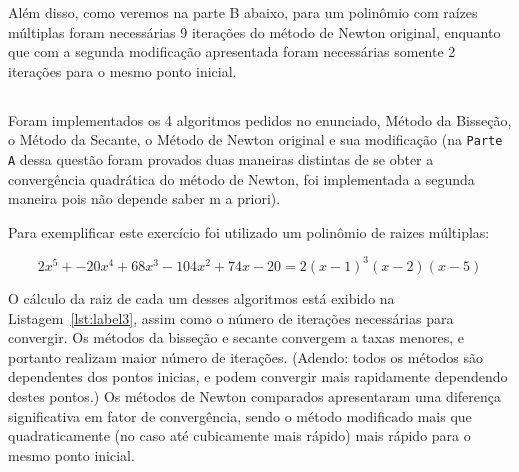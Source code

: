 \documentclass[12pt,a4paper,final]{article}
\begin{document}
Além disso, como veremos na parte B abaixo, para um polinômio com raízes múltiplas
foram necessárias 9 iterações do método de Newton original, enquanto que com a segunda modificação
apresentada foram necessárias somente 2 iterações para o mesmo ponto inicial.


\subsection{}

Foram implementados os 4 algoritmos pedidos no enunciado, Método da Bisseção, o Método da Secante,
o Método de Newton original e sua modificação (na \texttt{Parte A} dessa questão foram provados duas maneiras
distintas de se obter a convergência quadrática do método de Newton, foi implementada a segunda maneira pois não
depende saber m a priori).

Para exemplificar este exercício foi utilizado um polinômio de raizes múltiplas:

\[ 2x^5 + - 20x^4 + 68x^3 -104x^2 + 74x -20 = 2(x-1)^3(x-2)( x-5)\]

O cálculo da raiz de cada um desses algoritmos está exibido na Listagem~\ref{lst:label3}, assim como
o número de iterações necessárias para convergir. Os métodos da bisseção e secante convergem a taxas menores,
e portanto realizam maior número de iterações. (Adendo: todos os métodos são dependentes dos pontos inicias,
e podem convergir mais rapidamente dependendo destes pontos.) Os métodos de Newton comparados apresentaram uma
diferença significativa em fator de convergência, sendo o método modificado mais que quadraticamente (no caso até cubicamente mais rápido)
 mais rápido para o mesmo ponto inicial.
\end{document}
